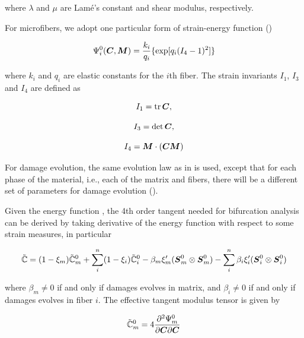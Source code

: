 \documentclass[12pt]{article}
\numberwithin{equation}{section}
\begin{document}
where $\lambda$ and $\mu$ are Lam\'{e}'s constant and shear modulus,
respectively.  

For microfibers, we adopt one particular form of strain-energy 
function (\cite{Holzapfel.etal:2010})

\begin{equation}
  \Psi_i^0({\boldsymbol{C}}, {\boldsymbol{M}}) 
    = \frac{k_i}{q_i}
    \{ \exp[q_i(I_4 - 1)^2] \}
\end{equation}

where $k_i$ and $q_i$ are elastic constants for the $i$th fiber. 
The strain invariants $I_1$, $I_3$ and $I_4$ are defined as

\begin{equation}
  I_1 = \operatorname{\text{tr}} {\boldsymbol{C}}, 
\end{equation}

\begin{equation}
  I_3 = \det {\boldsymbol{C}},
\end{equation}

\begin{equation}
  I_4 = {\boldsymbol{M}} \cdot ({\boldsymbol{C}} {\boldsymbol{M}})
\end{equation}

For damage evolution, the same evolution law as in  
is used, except that for each phase of the material, i.e., each of the 
matrix and fibers, there will be a different set of parameters for
damage evolution (\cite{Chen.etal:2014}).

Given the energy function , the 4th order
tangent needed for bifurcation analysis can be derived by taking
derivative of the energy function with respect to some strain 
measures, in particular

\begin{equation}\label{eq:aniso_tangent}
  \tilde{\mathbb{C}} 
   = (1-\xi_m)\tilde{\mathbb{C}}_m^0 
   + \sum_i^n (1-\xi_i) \tilde{\mathbb{C}}_i^0
   -\beta_m \xi_m' ({\boldsymbol{S}}_m^0 \otimes {\boldsymbol{S}}_m^0 )
   - \sum_i^n \beta_i \xi_i' ({\boldsymbol{S}}_i^0 \otimes {\boldsymbol{S}}_i^0 )
\end{equation}

where $\beta_m\neq 0$ if and only if damages evolves in matrix, and
$\beta_i \neq 0$ if and only if damages evolves in fiber $i$. The 
effective tangent modulus tensor is given by

\begin{equation}\label{eq:aniso_tangent1}
  \tilde{\mathbb{C}}_m^0 = 
    4\frac{\partial ^2 \Psi_m^0}{\partial{\boldsymbol{C}} \partial{\boldsymbol{C}}}
\end{equation}
\end{document}
